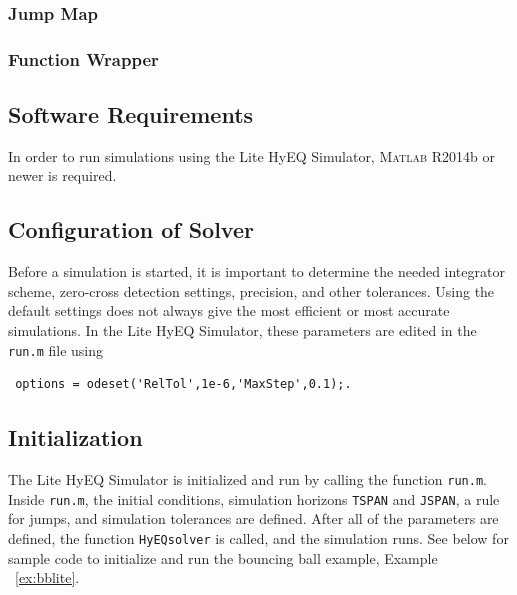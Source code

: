 \documentclass{article}
\newcommand{\matlab}{\textsc{Matlab}}
\newcommand{\ricardo}[1]{{\color{blue} #1}}
\begin{document}
% 
\label{scr:zeroevents}

\subsubsection{Jump Map}
\label{sec:jumpmap}

% 
\label{scr:jump}

\subsubsection{Function Wrapper}
\label{sec:funwrapp}

% 
\label{scr:funwrapp}

\subsection{Software Requirements}

In order to run simulations using the Lite HyEQ Simulator, \matlab{} R2014b or newer is required.

\subsection{Configuration of Solver}

Before a simulation is started, it is important to determine the needed integrator scheme, zero-cross detection settings, precision, and other tolerances. Using the default settings does not always give the most efficient or most accurate simulations.
In the Lite HyEQ Simulator, these parameters are edited in the {\tt run.m} file using

\begin{verbatim} options = odeset('RelTol',1e-6,'MaxStep',0.1);. \end{verbatim}

\subsection{Initialization}


The Lite HyEQ Simulator is initialized and run by calling the function {\tt run.m}. Inside {\tt run.m}, the initial conditions, simulation horizons {\tt TSPAN} and {\tt JSPAN}, a rule for jumps, and simulation tolerances are defined. After all of the parameters are defined, the function {\tt HyEQsolver} is called, and the simulation runs. See below for sample code to initialize and run the bouncing ball example, Example ~\ref{ex:bblite}.\\
\end{document}
